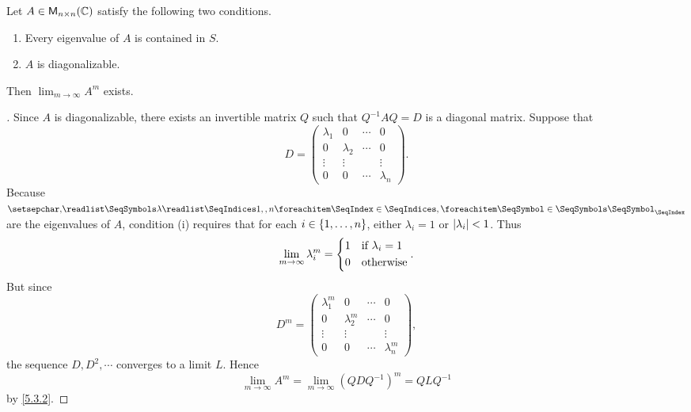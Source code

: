 \begin{thm}\label{5.14}
	Let \(A \in \ms[n][n][\C]\) satisfy the following two conditions.
	\begin{enumerate}
		\item Every eigenvalue of \(A\) is contained in \(S\).
		\item \(A\) is diagonalizable.
	\end{enumerate}
	Then \(\lim_{m \to \infty} A^m\) exists.
\end{thm}

\begin{proof}[]
	Since \(A\) is diagonalizable, there exists an invertible matrix \(Q\) such that \(Q^{-1} A Q = D\) is a diagonal matrix.
	Suppose that
	\[
		D = \begin{pmatrix}
			\lambda_1 & 0         & \cdots & 0         \\
			0         & \lambda_2 & \cdots & 0         \\
			\vdots    & \vdots    &        & \vdots    \\
			0         & 0         & \cdots & \lambda_n
		\end{pmatrix}.
	\]
	Because \(\seq{\lambda}{1,,n}\) are the eigenvalues of \(A\), condition (i) requires that for each \(i \in \left\lbrace1, \dots, n\right\rbrace\), either \(\lambda_i = 1\) or \(\left\lvert\lambda_i\right\rvert < 1\).
	Thus
	\[
		\lim_{m \to \infty} \lambda_i^m = \begin{dcases}
			1 & \text{if } \lambda_i = 1 \\
			0 & \text{otherwise}
		\end{dcases}.
	\]
	But since
	\[
		D^m = \begin{pmatrix}
			\lambda_1^m & 0           & \cdots & 0           \\
			0           & \lambda_2^m & \cdots & 0           \\
			\vdots      & \vdots      &        & \vdots      \\
			0           & 0           & \cdots & \lambda_n^m
		\end{pmatrix},
	\]
	the sequence \(D, D^2, \cdots\) converges to a limit \(L\).
	Hence
	\[
		\lim_{m \to \infty} A^m = \lim_{m \to \infty} (Q D Q^{-1})^m = Q L Q^{-1}
	\]
	by \cref{5.3.2}.
\end{proof}

